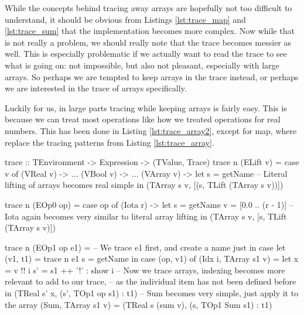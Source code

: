        While the concepts behind tracing away arrays are hopefully not too difficult to understand, it should be obvious from Listings \ref{lst:trace_map} and \ref{lst:trace_sum} that the implementation becomes more complex.
        Now while that is not really a problem, we should really note that the trace becomes messier as well.
        This is especially problematic if we actually want to read the trace to see what is going on: not impossible, but also not pleasant, especially with large arrays.
        So perhaps we are tempted to keep arrays in the trace instead, or perhaps we are interested in the trace of arrays specifically.

        Luckily for us, in large parts tracing while keeping arrays is fairly easy.
        This is because we can treat most operations like how we treated operations for real numbers.
        This has been done in Listing \ref{lst:trace_array2}, except for map, where replace the tracing patterns from Listing \ref{lst:trace_array}.

        \begin{haskell}[caption=Tracing whilst keeping arrays, label=lst:trace_array2, gobble=12]
            trace :: TEnvironment -> Expression -> (TValue, Trace)
            trace n (ELift v) =
                case v of
                    (VReal  v) -> $\ldots$
                    (VBool  v) -> $\ldots$
                    (VArray v) -> 
                        let s = getName
                        -- Literal lifting of arrays becomes real simple
                        in  (TArray s v, [(s, TLift (TArray s v))])

            trace n (EOp0 op) =
                case op of
                    (Iota r) ->
                        let s = getName
                            v = [0.0 .. (r - 1)]
                            -- Iota again becomes very similar to literal array lifting
                        in  (TArray s v, [s, TLift (TArray s v)])
            
            trace n (EOp1 op e1) =
                -- We trace e1 first, and create a name just in case
                let (v1, t1) = trace n e1
                    s = getName
                in  case (op, v1) of
                    (Idx i, TArray s1 v) =
                        let x  = v !! i
                            s' = s1 ++ '!' : show i
                        -- Now we trace arrays, indexing becomes more relevant to add to our trace,
                        -- as the individual item has not been defined before
                        in  (TReal s' x, (s', TOp1 op s1) : t1)
                    -- Sum becomes very simple, just apply it to the array
                    (Sum, TArray s1 v) = (TReal s (sum v), (s, TOp1 Sum s1) : t1)
        \end{haskell}

